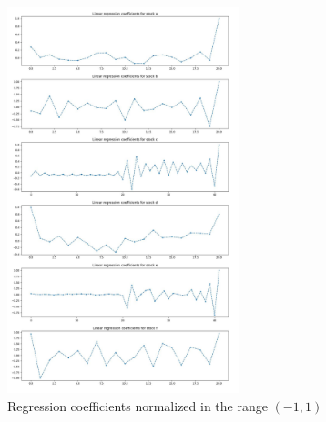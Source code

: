 \documentclass{article}
\begin{document}
\begin{figure}[htb]
	\centering
	\includegraphics[width=0.6\textwidth, ]{model_coeffs.jpg}
	\caption{Regression coefficients normalized in the range $(-1,1)$}
	\label{fig8}
\end{figure}	
\end{document}
